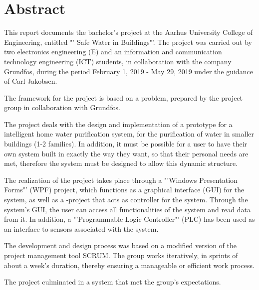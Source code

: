 
\chapter*{Abstract}
This report documents the bachelor's project at the Aarhus University College of Engineering, entitled "' Safe Water in Buildings"'. The project was carried out by two electronics engineering (E) and an information and communication technology engineering (ICT) students, in collaboration with the company Grundfos, during the period February 1, 2019 - May 29, 2019 under the guidance of Carl Jakobsen.

The framework for the project is based on a problem, prepared by the project group in collaboration with Grundfos.

The project deals with the design and implementation of a prototype for a intelligent home water purification system, for the purification of water in smaller buildings (1-2 families). In addition, it must be possible for a user to have their own system built in exactly the way they want, so that their personal needs are met, therefore the system must be designed to allow this dynamic structure.

The realization of the project takes place through a "'Windows Presentation Forms"' (WPF) project, which functions as a graphical interface (GUI) for the system, as well as a \CS-project that acts as controller for the system. Through the system's GUI, the user can access all functionalities of the system and read data from it. In addition, a "'Programmable Logic Controller"' (PLC) has been used as an interface to sensors associated with the system.

The development and design process was based on a modified version of the project management tool SCRUM. The group works iteratively, in sprints of about a week's duration, thereby ensuring a manageable or efficient work process.

The project culminated in a system that met the group's expectations.